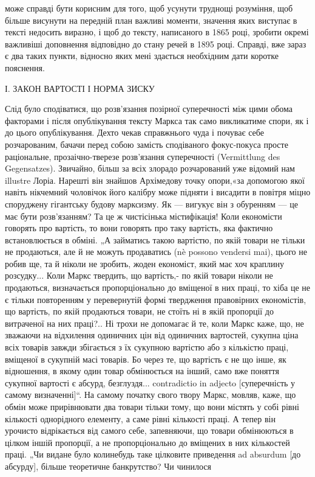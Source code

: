 \parcont{}  %
може справді бути корисним для того, щоб усунути труднощі розуміння, щоб більше висунути на
передній план важливі моменти, значення яких виступає в тексті недосить виразно, і щоб до
тексту, написаного в 1865 році, зробити окремі важливіші доповнення відповідно до стану речей в
1895 році. Справді, вже зараз є два таких пункти, відносно яких мені здається необхідним дати
коротке пояснення.

І. ЗАКОН ВАРТОСТІ І НОРМА ЗИСКУ

Слід було сподіватися, що розв’язання позірної суперечності між цими обома факторами і після
опублікування тексту Маркса так само викликатиме спори, як і до цього опублікування. Дехто чекав
справжнього чуда і почуває себе розчарованим, бачачи перед собою замість сподіваного фокус-покуса
просте раціональне, прозаічно-тверезе розв’язання суперечності (Vermittlung
des Gegensatzes). Звичайно, більш за всіх злорадо розчарований уже відомий нам illustre Лоріа.
Нарешті він знайшов Архімедову точку опори,«за допомогою якої навіть нікчемний чоловічок його
калібру може підняти і висадити в повітря міцно споруджену гігантську будову марксизму. Як —
вигукує він з обуренням — це має бути розв’язанням? Та це ж чистісінька містифікація! Коли
економісти говорять про вартість, то вони говорять про таку вартість, яка фактично встановлюється
в обміні. „А займатись такою вартістю, по якій товари не тільки не продаються, але й не можуть
продаватись (nè possono vendersi mai), цього не робив ще, та й ніколи не зробить, жоден
економіст, який має хоч краплину розсудку... Коли Маркс твердить, що вартість,- по якій товари
ніколи не продаються, визначається пропорціонально до вміщеної в них праці, то хіба це не є тільки повторенням у
перевернутій формі твердження правовірних економістів, що вартість, по
якій продаються товари, не стоїть ні в якій пропорції до витраченої на них праці?..  Ні трохи не
допомагає й те, коли Маркс каже, що, не зважаючи
на відхилення одиничних цін від одиничних вартостей, сукупна ціна всіх товарів завжди збігається
з їх сукупною вартістю або з кількістю праці, вміщеної в сукупній масі товарів. Бо через те, що
вартість є не що інше, як відношення, в якому один товар обмінюється на інший, само вже поняття
сукупної вартості є абсурд, безглуздя... contradictio in adjecto [суперечність у самому визначенні]“. На самому
початку свого твору Маркс, мовляв, каже, що обмін може прирівнювати два товари
тільки тому, що вони містять у собі рівні кількості однорідного елементу, а саме рівні кількості
праці. А тепер він урочисто відрікається від самого себе, запевняючи, що товари обмінюються в
цілком іншій пропорції, а не
пропорціонально до вміщених в них кількостей праці. „Чи видане було колинебудь таке цілковите
приведення ad absurdum [до абсурду], більше теоретичне банкрутство? Чи чинилося
\parbreak{}  %
